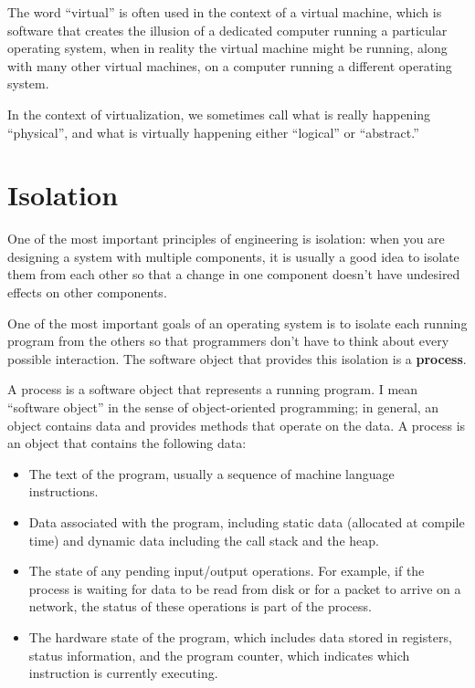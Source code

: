 \documentclass[12pt]{book}
\begin{document}
The word ``virtual'' is often used in the context of a virtual
machine, which is software that creates the illusion of a dedicated
computer running a particular operating system, when in reality
the virtual machine might be running, along with many other virtual
machines, on a computer running a different operating system.

In the context of virtualization, we sometimes call what is
really happening ``physical'', and what is virtually happening
either ``logical'' or ``abstract.''


\section{Isolation}

One of the most important principles of engineering is isolation:
when you are designing a system with multiple components, it is usually
a good idea to isolate them from each other so that a change in one
component doesn't have undesired effects on other components.

One of the most important goals of an operating system is to isolate
each running program from the others so that programmers don't have to
think about every possible interaction.  The software object that
provides this isolation is a {\bf process}.

A process is a software object that represents a running program.
I mean ``software object'' in the sense of object-oriented programming;
in general, an object contains data and provides methods
that operate on the data.  A process is an object that contains the
following data:

\begin{itemize}

\item The text of the program, usually a sequence of
  machine language instructions.

\item Data associated with the program, including static data (allocated
  at compile time) and dynamic data including the call stack and
  the heap.

\item The state of any pending input/output operations.  For example,
  if the process is waiting for data to be read from disk or for a
  packet to arrive on a network, the status of these operations is
  part of the process.

\item The hardware state of the program, which includes data stored
  in registers, status information, and the program counter, which
  indicates which instruction is currently executing.

\end{itemize}
\end{document}
